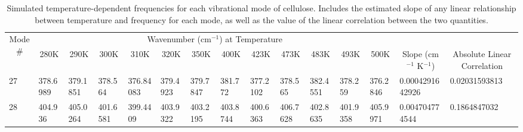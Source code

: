 \begin{landscape}
	{\tiny \begin{longtable}{@{}lllllllllllllll@{}}
		\caption{\small Simulated temperature-dependent frequencies for each vibrational mode of cellulose. Includes the estimated slope of any linear relationship between temperature and frequency for each mode, as well as the value of the linear correlation between the two quantities.}\\
		\toprule
		\multicolumn{1}{c}{\multirow{2}{*}{Mode \#}} & \multicolumn{12}{c}{Wavenumber (cm$^{-1}$) at Temperature}                                                                                                                                                                                                                                                                        & \multicolumn{1}{c}{}                                                   & \multicolumn{1}{c}{}                            \\ \cmidrule(lr){2-13}
		\multicolumn{1}{c}{}                         & \multicolumn{1}{c}{280K} & \multicolumn{1}{c}{290K} & \multicolumn{1}{c}{300K} & \multicolumn{1}{c}{310K} & \multicolumn{1}{c}{320K} & \multicolumn{1}{c}{350K} & \multicolumn{1}{c}{400K} & \multicolumn{1}{c}{423K} & \multicolumn{1}{c}{473K} & \multicolumn{1}{c}{483K} & \multicolumn{1}{c}{493K} & \multicolumn{1}{c}{500K} & \multicolumn{1}{c}{Slope (cm$^{-1}$ K$^{-1}$)} & \multicolumn{1}{c}{Absolute Linear Correlation} \\ \midrule
		27                                           & 378.6989                 & 379.1851                 & 378.564                  & 376.84083                & 379.4923                 & 379.7847                 & 381.772                  & 377.2102                 & 378.565                  & 382.4551                 & 378.259                  & 376.2846                 & 0.0004291642926                                                        & 0.02031593813                                   \\
		28                                           & 404.936                  & 405.0264                 & 401.6581                 & 399.4409                 & 403.9322                 & 403.2195                 & 403.8744                 & 400.6363                 & 406.7628                 & 402.8635                 & 401.9358                 & 405.9971                 & 0.004704774544                                                         & 0.1864847032                                    \\

\end{longtable}}
\end{landscape}
